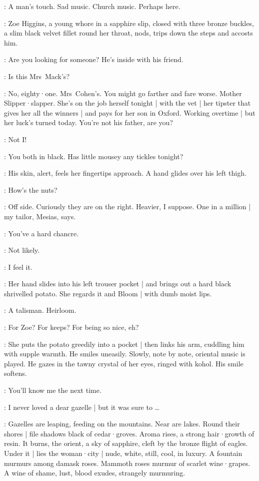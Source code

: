 \Bloom:
A man's touch.
Sad music.
Church music.
Perhaps here.

:
Zoe Higgins,
a young whore in a sapphire slip,
closed with three bronze buckles,
a slim black velvet fillet round her throat,
nods,
trips down the steps and accosts him.

\Zoe:
Are you looking for someone?
He's inside with his friend.

\Bloom:
Is this Mrs~Mack's?

\Zoe:
No,
eighty·one.
Mrs~Cohen's.
You might go farther and fare worse.
Mother Slipper·slapper.
She's on the job herself tonight |
with the vet |
her tipster that gives her all the winners |
and pays for her son in Oxford.
Working overtime |
but her luck's turned today.
You're not his father,
are you?

\Bloom:
Not I!

\Zoe:
You both in black.
Has little mousey any tickles tonight?

:
His skin,
alert,
feels her fingertips approach.
A hand glides over his left thigh.

\Zoe:
How's the nuts?

\Bloom:
Off side.
Curiously they are on the right.
Heavier,
I suppose.
One in a million |
my tailor,
Mesias,
says.

\Zoe:
You've a hard chancre.

\Bloom:
Not likely.

\Zoe:
I feel it.

:
Her hand slides into his left trouser pocket |
and brings out a hard black shrivelled potato.
She regards it and Bloom |
with dumb moist lips.

\Bloom:
A talisman.
Heirloom.

\Zoe:
For Zoe?
For keeps?
For being so nice,
eh?

:
She puts the potato greedily into a pocket |
then links his arm,
cuddling him with supple warmth.
He smiles uneasily.
Slowly,
note by note,
oriental music is played.
He gazes in the tawny crystal of her eyes,
ringed with kohol.
His smile softens.

\Zoe:
You'll know me the next time.

\Bloom:
I never loved a dear gazelle |
but it was sure to \ldots

:
Gazelles are leaping,
feeding on the mountains.
Near are lakes.
Round their shores |
file shadows black of cedar·groves.
Aroma rises,
a strong hair·growth of resin.
It burns,
the orient,
a sky of sapphire,
cleft by the bronze flight of eagles.
Under it |
lies the woman·city |
nude,
white,
still,
cool,
in luxury.
A fountain murmurs among damask roses.
Mammoth roses murmur of scarlet wine·grapes.
A wine of shame,
lust,
blood exudes,
strangely murmuring.%

